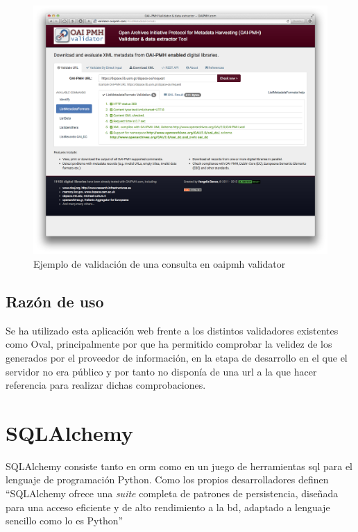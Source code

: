 \begin{figure}[!htbp]
	\centering
	\includegraphics[scale=0.2]{fig/oaipmh_validator_example}
	\caption{Ejemplo de validación de una consulta en \acrshort{oaipmh} validator}
	\label{fig:oai_validator}
\end{figure}

\subsection{Razón de uso}

Se ha utilizado esta aplicación web frente a los distintos validadores existentes como Oval\cite{Oval}, principalmente por que ha permitido comprobar la velidez de los  generados por el proveedor de información, en la etapa de desarrollo en el que el servidor no era público y por tanto no disponía de una \acrshort{url} a la que hacer referencia para realizar dichas comprobaciones.

\section{SQLAlchemy}

SQLAlchemy\cite{SQLAlchemy} consiste tanto en \acrfull{orm} como en un juego de herramientas \acrshort{sql} para el lenguaje de programación Python. Como los propios desarrolladores definen ``SQLAlchemy ofrece una \textit{suite} completa de patrones de persistencia, diseñada para una acceso eficiente y de alto rendimiento a la \acrlong{bd}, adaptado a lenguaje sencillo como lo es Python''

